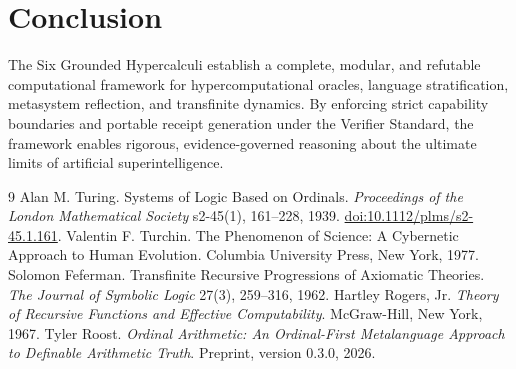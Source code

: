 \documentclass[11pt]{article}
\theoremstyle{definition}
\begin{document}
\section{Conclusion}
The Six Grounded Hypercalculi establish a complete, modular, and refutable computational framework for hypercomputational oracles, language stratification, metasystem reflection, and transfinite dynamics. By enforcing strict capability boundaries and portable receipt generation under the Verifier Standard, the framework enables rigorous, evidence-governed reasoning about the ultimate limits of artificial superintelligence.

\begin{thebibliography}{9}
\small
{} Alan M. Turing. Systems of Logic Based on Ordinals. \emph{Proceedings of the London Mathematical Society} s2-45(1), 161--228, 1939. \href{https://doi.org/10.1112/plms/s2-45.1.161}{doi:10.1112/plms/s2-45.1.161}.
 Valentin F. Turchin. The Phenomenon of Science: A Cybernetic Approach to Human Evolution. Columbia University Press, New York, 1977.
 Solomon Feferman. Transfinite Recursive Progressions of Axiomatic Theories. \emph{The Journal of Symbolic Logic} 27(3), 259--316, 1962.
 Hartley Rogers, Jr. \emph{Theory of Recursive Functions and Effective Computability}. McGraw-Hill, New York, 1967.
 Tyler Roost. \emph{Ordinal Arithmetic: An Ordinal-First Metalanguage Approach to Definable Arithmetic Truth}. Preprint, version 0.3.0, 2026.
\end{thebibliography}
\end{document}
